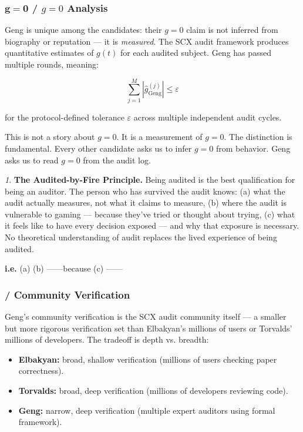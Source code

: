 \documentclass[12pt,a4paper]{article}
\theoremstyle{remark}
\newcommand{\biasParam}{g}
\newtheorem{govinsight}{}[section]
\newenvironment{govbox}{%
  \begin{center}
  \color{insightblue}
  \begin{minipage}{0.92\textwidth}
  \begin{govinsight}
}{%
  \end{govinsight}
  \end{minipage}
  \end{center}
}
\begin{document}
\subsubsection{$\mathbf{g=0}$  / $g=0$ Analysis}

Geng is unique among the candidates: their $g=0$ claim is not inferred from
biography or reputation — it is \textit{measured}. The SCX audit framework
produces quantitative estimates of $\biasParam(t)$ for each audited subject.
Geng has passed multiple rounds, meaning:

\begin{equation}
    \sum_{j=1}^{M} |\hat{g}_{\text{Geng}}^{(j)}| \leq \varepsilon
    \label{eq:geng-pass}
\end{equation}

for the protocol-defined tolerance $\varepsilon$ across multiple independent
audit cycles.

This is not a story about $g=0$. It is a measurement of $g=0$. The distinction
is fundamental. Every other candidate asks us to infer $g=0$ from behavior.
Geng asks us to read $g=0$ from the audit log.

\begin{govbox}
\textbf{The Audited-by-Fire Principle.}
Being audited is the best qualification for being an auditor. The person who
has survived the audit knows: (a) what the audit actually measures, not what
it claims to measure, (b) where the audit is vulnerable to gaming — because
they've tried or thought about trying, (c) what it feels like to have every
decision exposed — and why that exposure is necessary. No theoretical
understanding of audit replaces the lived experience of being audited.

\textbf{i.e.}
(a) 
(b) ——because
(c) ——

\end{govbox}

\subsubsection{ / Community Verification}

Geng's community verification is the SCX audit community itself — a smaller
but more rigorous verification set than Elbakyan's millions of users or
Torvalds' millions of developers. The tradeoff is depth vs. breadth:

\begin{itemize}[leftmargin=*]
    \item \textbf{Elbakyan:} broad, shallow verification (millions of users
          checking paper correctness).
    \item \textbf{Torvalds:} broad, deep verification (millions of developers
          reviewing code).
    \item \textbf{Geng:} narrow, deep verification (multiple expert auditors
          using formal framework).
\end{itemize}
\end{document}
